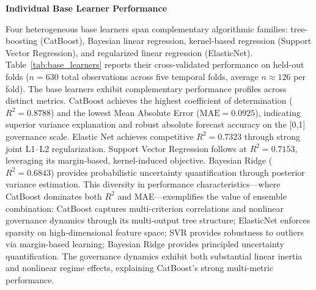 \documentclass[12pt,a4paper]{article}
\begin{document}
\textbf{Individual Base Learner Performance}

Four heterogeneous base learners span complementary algorithmic families: tree-boosting (CatBoost), Bayesian linear regression, kernel-based regression (Support Vector Regression), and regularized linear regression (ElasticNet). Table~\ref{tab:base_learners} reports their cross-validated performance on held-out folds ($n=630$ total observations across five temporal folds, average $n \approx 126$ per fold). The base learners exhibit complementary performance profiles across distinct metrics. CatBoost achieves the highest coefficient of determination ($R^2 = 0.8788$) and the lowest Mean Absolute Error ($\mathrm{MAE} = 0.0925$), indicating superior variance explanation and robust absolute forecast accuracy on the [0,1] governance scale. Elastic Net achieves competitive $R^2 = 0.7323$ through strong joint L1--L2 regularization. Support Vector Regression follows at $R^2 = 0.7153$, leveraging its margin-based, kernel-induced objective. Bayesian Ridge ($R^2 = 0.6843$) provides probabilistic uncertainty quantification through posterior variance estimation. This diversity in performance characteristics---where CatBoost dominates both $R^2$ and MAE---exemplifies the value of ensemble combination: CatBoost captures multi-criterion correlations and nonlinear governance dynamics through its multi-output tree structure; ElasticNet enforces sparsity on high-dimensional feature space; SVR provides robustness to outliers via margin-based learning; Bayesian Ridge provides principled uncertainty quantification. The governance dynamics exhibit both substantial linear inertia and nonlinear regime effects, explaining CatBoost's strong multi-metric performance.
\end{document}
